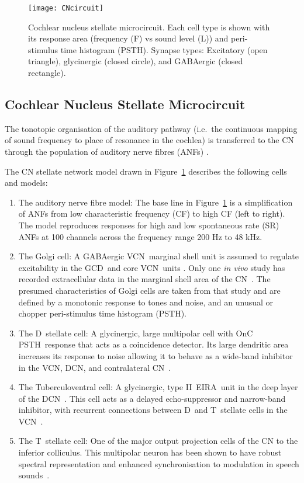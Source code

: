 \begin{figure}[tb]
  \centerline{\texttt{[image: CNcircuit]}}
  \caption{Cochlear nucleus stellate microcircuit. Each cell type
    is shown with its response area (frequency (F) vs sound level
    (L)) and peri-stimulus time histogram (PSTH).  Synapse types:
    Excitatory (open triangle), glycinergic (closed circle), and
    GABAergic (closed rectangle).} \label{fig:microcircuit}
\end{figure}

\subsection{Cochlear Nucleus Stellate Microcircuit}

The tonotopic organisation of the auditory pathway (i.e.\ the continuous
mapping of sound frequency to place of resonance in the cochlea) is
transferred to the CN through the population of auditory nerve fibres
(ANFs) \cite{Lorente:1981}.


The CN stellate network model drawn in Figure~\ref{fig:microcircuit}
describes the following cells and models:
\begin{enumerate}
\item The auditory nerve fibre model: The base line in
  Figure~\ref{fig:microcircuit} is a simplification of ANFs from
  low characteristic frequency (CF) to high CF (left to right).
  The model reproduces responses for high and low spontaneous rate
  (SR) ANFs at 100 channels across the frequency range 200 Hz to 48
  kHz.
\item The Golgi cell: A {GABA}ergic VCN~marginal shell unit is
  assumed to regulate excitability in the GCD~and core VCN~units
  \cite{FerragamoGoldingEtAl:1998}.  Only one \textit{in vivo}
  study has recorded extracellular data in the marginal shell area
  of the CN~\cite{GhoshalKim:1997}.  The presumed characteristics
  of Golgi cells are taken from that study and are defined by a
  monotonic response to tones and noise,
  and an unusual or chopper peri-stimulus time histogram (PSTH).
\item The D~stellate cell: A glycinergic, large multipolar cell
  with OnC PSTH~response  that acts as a coincidence detector.  Its
  large dendritic area increases its response to noise allowing it
  to behave as a wide-band inhibitor in the VCN, DCN, and
  contralateral
  CN~\cite{SmithMassieEtAl:2005,ArnottWallaceEtAl:2004,NeedhamPaolini:2007}.
\item The Tuberculoventral cell: A glycinergic, type II~{EIRA}~unit
  in the deep layer of the DCN~\cite{SpirouDavisEtAl:1999}.  This
  cell acts as a delayed echo-suppressor and narrow-band inhibitor,
  with recurrent connections between D~and T~stellate cells in the
  VCN~\cite{Alibardi:2006,OertelWickesberg:1993,WickesbergWhitlonEtAl:1991}.
\item The T~stellate cell: One of the major output projection cells
  of the CN to the inferior colliculus.  This
  multipolar neuron has been shown to have robust spectral
  representation and enhanced synchronisation to modulation in
  speech
  sounds~\cite{BlackburnSachs:1990,KeilsonRichardsEtAl:1997}.
\end{enumerate}

